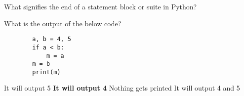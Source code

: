 \documentclass{exam}
\begin{document}
\begin{questions}
    \question What signifies the end of a statement block or suite in Python?

    \question What is the output of the below code?

    \begin{verbatim}
        a, b = 4, 5
        if a < b:
            m = a
        m = b
        print(m)
    \end{verbatim}

    \begin{oneparchoices}
        \choice It will output 5
        \choice \textbf{It will output 4}
        \choice Nothing gets printed
        \choice It will output 4 and 5
    \end{oneparchoices}

\end{questions}
\end{document}

